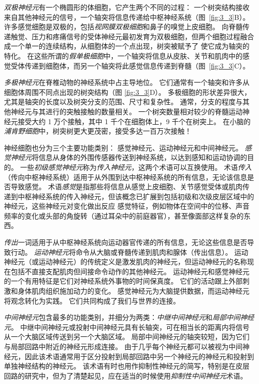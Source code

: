 \textit{双极神经元}有一个椭圆形的体细胞，它产生两个不同的过程：
一个树突结构接收来自其他神经元的信号，一个轴突将信息传递给中枢神经系统（图~\ref{fig:3_3}B）。
许多感觉细胞是双极的，包括\textit{视网膜双极细胞}和鼻子的嗅觉上皮细胞。
向脊髓传递触觉、压力和疼痛信号的受体神经元最初发育为双极细胞，但两个细胞过程融合成一个单一的连续结构，从细胞体的一个点出现，树突被赋予了 使它成为轴突的特化。 
在这些所谓的\textit{假单极细胞}中，一个轴突将信息从皮肤、关节和肌肉中的感觉受体传递到细胞体，而另一个轴突将此感觉信息传递到脊髓（图~\ref{fig:3_3}C）。


\textit{多极神经元}在脊椎动物的神经系统中占主导地位。 
它们通常有一个轴突和许多从细胞体周围不同点出现的树突结构（图 \ref{fig:3_3}D）。 
多极细胞的形状差异很大，尤其是轴突的长度以及树突分支的范围、尺寸和复杂性。 
通常，分支的程度与其他神经元与其进行的突触接触的数量相关。 
一个树突数量相对较少的脊髓运动神经元接受大约 1 万个接触，其中 1 千个在细胞体上，9 千个在树突上。
在小脑的\textit{浦肯野细胞}中，树突树更大更茂密，接受多达一百万次接触！


神经细胞也分为三个主要功能类别：
感觉神经元、运动神经元和中间神经元。 
\textit{感觉神经元}将信息从身体的外围传感器传送到神经系统，以达到感知和运动协调的目的。 
一些\textit{初级感觉神经元}称为\textit{传入神经元}，这两个术语可以互换使用。 
术语\textit{传入}（传向中枢神经系统）适用于从外围到达中枢神经系统的所有信息，无论该信息是否导致感觉。
术语\textit{感觉}是指那些将信息从感觉上皮细胞、关节感觉受体或肌肉传递到中枢神经系统的传入神经元，但该概念已扩展到包括初级和次级皮层区域中的神经元，这些神经元对变化做出反应 感觉特征，例如物体在空间中的位移、声音频率的变化或头部的角旋转（通过耳朵中的前庭器官），甚至像面部这样复杂的东西。


\textit{传出}一词适用于从中枢神经系统向运动器官传递的所有信息，无论这些信息是否导致行动。
\textit{运动神经元}将命令从大脑或脊髓传递到肌肉和腺体（传出信息）。 
运动神经元（或运动神经元）的传统定义是激发肌肉的神经元，但运动神经元的名称现在包括不直接支配肌肉但间接命令动作的其他神经元。
运动神经元和感觉神经元的一个有用特征是它们对神经系统外事物的时间保真度。 
它们的活动跟上外部刺激和身体肌肉组织施加动力的变化。 
感觉神经元为大脑提供数据，而运动神经元将观念转化为实践。 
它们共同构成了我们与世界的连接。


\textit{中间神经元}包含最多的功能类别，并细分为两类：\textit{中继中间神经元}和\textit{局部中间神经元}。
中继中间神经元或投射中间神经元具有长轴突，可在相当长的距离内将信号从一个大脑区域传送到另一个大脑区域。
局部中间神经元的轴突较短，因为它们与局部回路中附近的神经元形成连接。
由于几乎每个神经元都可以被视为中间神经元，因此该术语通常用于区分投射到局部回路中另一个神经元的神经元和投射到单独神经结构的神经元。
该术语有时也用作抑制性神经元的简写，特别是在皮层回路的研究中，但为了清楚起见，应在适当的时候使用\textit{抑制性中间神经元}术语。


